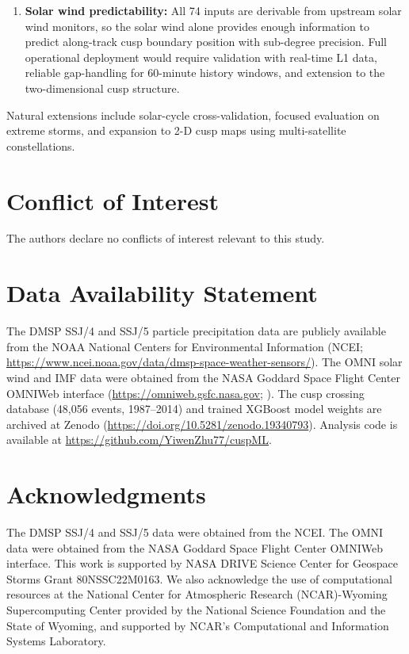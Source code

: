 \documentclass[draft]{agujournal2019}
\let\citealt\citeNP
\begin{document}
\begin{enumerate}
\item \textbf{Solar wind predictability:} All 74 inputs are derivable from upstream solar wind monitors, so the solar wind alone provides enough information to predict along-track cusp boundary position with sub-degree precision. Full operational deployment would require validation with real-time L1 data, reliable gap-handling for 60-minute history windows, and extension to the two-dimensional cusp structure.
\end{enumerate}

Natural extensions include solar-cycle cross-validation, focused evaluation on extreme storms, and expansion to 2-D cusp maps using multi-satellite constellations.

\section*{Conflict of Interest}
The authors declare no conflicts of interest relevant to this study.

\section*{Data Availability Statement}
The DMSP SSJ/4 and SSJ/5 particle precipitation data are publicly available from the NOAA National Centers for Environmental Information (NCEI; \url{https://www.ncei.noaa.gov/data/dmsp-space-weather-sensors/}). The OMNI solar wind and IMF data were obtained from the NASA Goddard Space Flight Center OMNIWeb interface (\url{https://omniweb.gsfc.nasa.gov}; \citealt{king2005omni}). The cusp crossing database (48,056 events, 1987--2014) and trained XGBoost model weights are archived at Zenodo (\url{https://doi.org/10.5281/zenodo.19340793}). Analysis code is available at \url{https://github.com/YiwenZhu77/cuspML}.

\section*{Acknowledgments}
The DMSP SSJ/4 and SSJ/5 data were obtained from the NCEI. The OMNI data were obtained from the NASA Goddard Space Flight Center OMNIWeb interface. This work is supported by NASA DRIVE Science Center for Geospace Storms Grant 80NSSC22M0163. We also acknowledge the use of computational resources at the National Center for Atmospheric Research (NCAR)-Wyoming Supercomputing Center provided by the National Science Foundation and the State of Wyoming, and supported by NCAR's Computational and Information Systems Laboratory.


\end{document}
